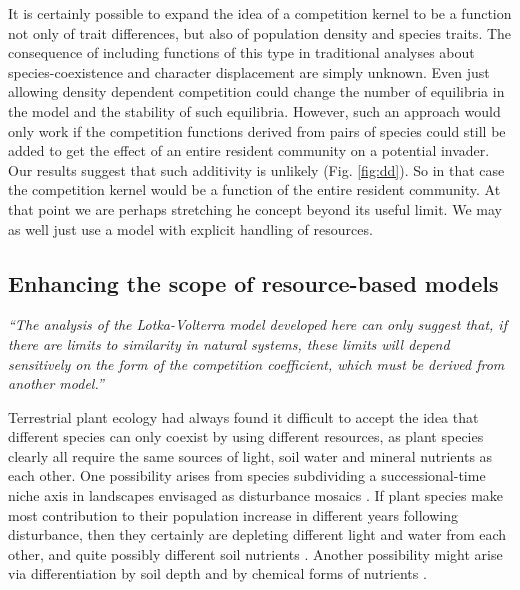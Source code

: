 \documentclass[a4paper,11pt]{article}
\begin{document}
It is certainly possible to expand the idea of a competition kernel to
be a function not only of trait differences, but also of population
density and species traits. The consequence of including functions of
this type in traditional analyses about species-coexistence and
character displacement are simply unknown.  Even just allowing density
dependent competition could change the number of equilibria in the
model and the stability of such equilibria.
%
However, such an approach would only work if the competition functions
derived from pairs of species could still be added to get the effect
of an entire resident community on a potential invader.
Our results suggest that such additivity is unlikely
(Fig. \ref{fig:dd}). So in that case the competition kernel would be a
function of the entire resident community.  At that point we are
perhaps stretching he concept beyond its useful limit. We may as well
just use a model with explicit handling of resources.

\subsection{Enhancing the scope of resource-based models}

\emph{``The analysis of the Lotka-Volterra model developed here can only
suggest that, if there are limits to similarity in natural systems, these
limits will depend sensitively on the form of the competition coefficient,
which must be derived from another model.''}\citep{Abrams-1975}

Terrestrial plant ecology had always found it difficult to accept the
idea that different species can only coexist by using different
resources, as plant species clearly all require the same sources of
light, soil water and mineral nutrients as each other. One possibility
arises from species subdividing a successional-time niche axis in
landscapes envisaged as disturbance mosaics \citep{Connell-1978}. If
plant species make most contribution to their population increase in
different years following disturbance, then they certainly are
depleting different light and water from each other, and quite
possibly different soil nutrients \citep{Moorcroft-2001}. Another
possibility might arise via differentiation by soil depth and by
chemical forms of nutrients \citep{Tilman-1977}.
\end{document}
